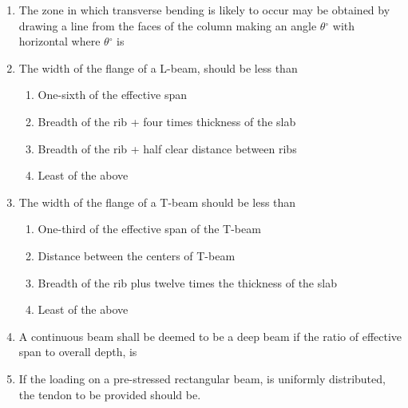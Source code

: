 \documentclass[11pt,a4paper]{article}
\begin{document}
\begin{enumerate}
\item{The zone in which transverse bending is likely to occur may be obtained by drawing a line from the faces of the column making an angle $\theta$$^\circ$ with horizontal where $\theta$$^\circ$ is
}
\\
\item{The width of the flange of a L-beam, should be less than}
\begin{enumerate}[label=\Alph*.]
\item{One-sixth of the effective span}
\item{Breadth of the rib + four times thickness of the slab}
\item{Breadth of the rib + half clear distance between ribs}
\item{Least of the above}
\end{enumerate}
\item{The width of the flange of a T-beam should be less than}
\begin{enumerate}[label=\Alph*.]
\item{One-third of the effective span of the T-beam}
\item{Distance between the centers of T-beam}
\item{Breadth of the rib plus twelve times the thickness of the slab}
\item{Least of the above}
\end{enumerate}
\item{A continuous beam shall be deemed to be a deep beam if the ratio of effective span to overall depth, is}
\\
\item{If the loading on a pre-stressed rectangular beam, is uniformly distributed, the tendon to be provided should be.}

\end{enumerate}
\end{document}
